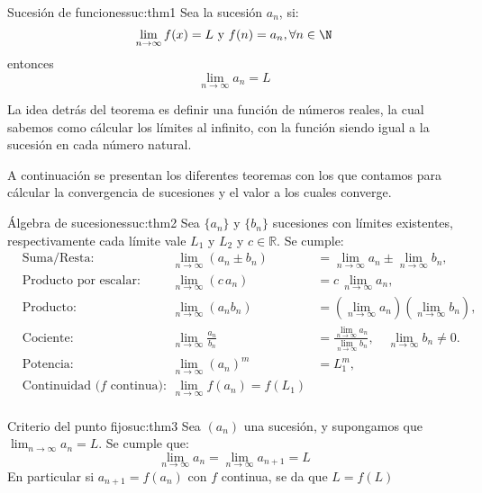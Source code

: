 \begin{teorema}{Sucesión de funciones}{suc:thm1}
    Sea la sucesión $a_n$, si:
    \[ 
        \lim_{n \to \infty} f(x) = L \text{ y } f(n) = a_n, \forall n \in \N
    \]
    entonces
    \[ 
        \lim_{n \to \infty} a_n = L
    \]
\end{teorema}

\begin{nota}
    La idea detrás del teorema es definir una función de números reales, la cual sabemos como cálcular los límites al infinito, con la función siendo igual a la sucesión en cada número natural.
\end{nota}

A continuación se presentan los diferentes teoremas con los que contamos para cálcular la convergencia de sucesiones y el valor a los cuales converge.

\begin{teorema}{Álgebra de sucesiones}{suc:thm2}
    Sea $\{a_n\}$ y $\{b_n\}$ sucesiones con límites existentes, respectivamente cada límite vale $L_1$ y $L_2$ y $c\in\mathbb{R}$. Se cumple:
    \[
    \begin{aligned}
        &\text{Suma/Resta:} & \lim_{n \to \infty} (a_n \pm b_n) &= \lim_{n \to \infty} a_n \pm \lim_{n \to \infty} b_n,\\
        &\text{Producto por escalar:} & \lim_{n \to \infty} (c\,a_n) &= c\,\lim_{n \to \infty} a_n,\\
        &\text{Producto:} & \lim_{n \to \infty} (a_n b_n) &= (\lim_{n \to \infty} a_n)(\lim_{n \to \infty} b_n),\\
        &\text{Cociente:} & \lim_{n \to \infty} \frac{a_n}{b_n} &= \frac{\lim\limits_{n \to \infty} a_n}{\lim\limits_{n \to \infty} b_n}, \quad \lim_{n\to\infty} b_n \neq 0. \\
        &\text{Potencia:} & \lim_{n \to \infty} (a_n)^m &= L_1^m,\\
        &\text{Continuidad ($f$ continua): } & \lim_{n \to \infty}f(a_n) = f(L_1) \\
    \end{aligned}
    \]
\end{teorema}

\begin{teorema}{Criterio del punto fijo}{suc:thm3}
    Sea $(a_n)$ una sucesión, y supongamos que $\lim_{n \to \infty} a_n = L$. Se cumple que:
    \[ 
        \lim_{n \to \infty} a_n = \lim_{n \to \infty} a_{n + 1} = L
    \]
    En particular si $a_{n + 1} = f(a_n)$ con $f$ continua, se da que $L = f(L)$
\end{teorema}

